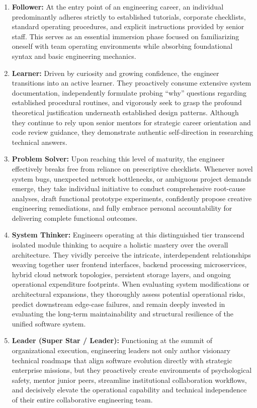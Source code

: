 \begin{enumerate}
\def\labelenumi{\arabic{enumi}.}
\tightlist
\item
  \textbf{Follower:} At the entry point of an engineering career, an
  individual predominantly adheres strictly to established tutorials,
  corporate checklists, standard operating procedures, and explicit
  instructions provided by senior staff. This serves as an essential
  immersion phase focused on familiarizing oneself with team operating
  environments while absorbing foundational syntax and basic engineering
  mechanics.
\item
  \textbf{Learner:} Driven by curiosity and growing confidence, the
  engineer transitions into an active learner. They proactively consume
  extensive system documentation, independently formulate probing
  ``why'' questions regarding established procedural routines, and
  vigorously seek to grasp the profound theoretical justification
  underneath established design patterns. Although they continue to rely
  upon senior mentors for strategic career orientation and code review
  guidance, they demonstrate authentic self-direction in researching
  technical answers.
\item
  \textbf{Problem Solver:} Upon reaching this level of maturity, the
  engineer effectively breaks free from reliance on prescriptive
  checklists. Whenever novel system bugs, unexpected network
  bottlenecks, or ambiguous project demands emerge, they take individual
  initiative to conduct comprehensive root-cause analyses, draft
  functional prototype experiments, confidently propose creative
  engineering remediations, and fully embrace personal accountability
  for delivering complete functional outcomes.
\item
  \textbf{System Thinker:} Engineers operating at this distinguished
  tier transcend isolated module thinking to acquire a holistic mastery
  over the overall architecture. They vividly perceive the intricate,
  interdependent relationships weaving together user frontend
  interfaces, backend processing microservices, hybrid cloud network
  topologies, persistent storage layers, and ongoing operational
  expenditure footprints. When evaluating system modifications or
  architectural expansions, they thoroughly assess potential operational
  risks, predict downstream edge-case failures, and remain deeply
  invested in evaluating the long-term maintainability and structural
  resilience of the unified software system.
\item
  \textbf{Leader (Super Star / Leader):} Functioning at the summit of
  organizational execution, engineering leaders not only author
  visionary technical roadmaps that align software evolution directly
  with strategic enterprise missions, but they proactively create
  environments of psychological safety, mentor junior peers, streamline
  institutional collaboration workflows, and decisively elevate the
  operational capability and technical independence of their entire
  collaborative engineering team.
\end{enumerate}

